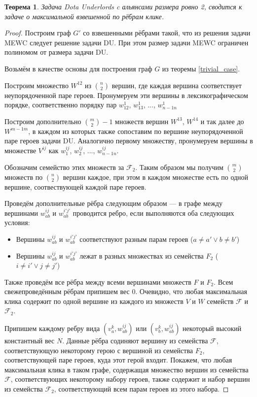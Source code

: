 \documentclass{article}
\newtheorem{theorem}{Теорема}
\begin{document}
\begin{theorem}
    Задача Dota Underlords c альянсами размера ровно 2, сводится к задаче о максимальной взвешенной по рёбрам клике.
\end{theorem}

\begin{proof}
    Построим граф $G'$ со взвешенными рёбрами такой, что из решения задачи MEWC следует решение задачи DU. При этом размер задачи MEWC ограничен полиномом от размера задачи DU.
    
    Возьмём в качестве основы для построения граф $G$ из теоремы \ref{trivial_case}.
    
    Построим множество $W^{12}$ из $\binom{n}{2}$ вершин, где каждая вершина соответствует неупорядоченной паре героев. Пронумеруем эти вершины в лексикографическом порядке, соответственно порядку пар $w_{12}^1$, $w_{13}^1$, ..., $w_{n-1 n}^1$
    
    Построим дополнительно $\binom{m}{2}-1$ множеств вершин $W^{13}$, $W^{14}$ и так далее до $W^{m-1 m}$, в каждом из которых также сопоставим по вершине неупорядоченной паре героев задачи DU. Аналогично первому множеству, пронумеруем вершины в множестве $V^{i j}$ как $w_1^{i j}$, $w_2^{i j}$, ..., $w_{n-1 n}^{i j}$.
    
    Обозначим семейство этих множеств за $\mathcal{F}_2$. Таким образом мы получим $\binom{m}{2}$ множеств по $\binom{n}{2}$ вершин каждое, при этом в каждом множестве есть по одной вершине, соотвествующей каждой паре героев.
    
    Проведём дополнительные рёбра следующим образом --- в графе между вершинами $w_{ab}^{i j}$ и $w_{ab}^{i' j'}$ проводится ребро, если выполняются оба следующих условия:
    \begin{itemize}
        \item Вершины $w_{ab}^{i j}$ и $w_{ab}^{i' j'}$ соответствуют разным парам героев ($a \neq a' \lor b \neq b'$)
        \item Вершины $w_{ab}^{i j}$ и $w_{ab}^{i' j'}$ лежат в разных множествах из семейства $F_2$ ($i \neq i' \lor j \neq j'$)
    \end{itemize}
    
    Также проведём все рёбра между всеми вершинами множеств $F$ и $F_2$. Всем свежепроведённым рёбрам припишем вес 0. Очевидно, что любая максимальная клика содержит по одной вершине из каждого из множеств $V$ и $W$ семейств $\mathcal{F}$ и $\mathcal{F}_2$. 
    
    Припишем каждому ребру вида $(v_a^k, w_{ab}^{i j})$ или $(v_b^k, w_{ab}^{i j})$ некоторый высокий константный вес $N$. Данные рёбра содиняют вершину из семейства $\mathcal{F}$, соответствующую некоторому герою с вершиной из семейства $F_2$, соответствующей паре героев, куда этот герой входит. Покажем, что любая максимальная клика в таком графе, содержащая множество вершин из семейства $\mathcal{F}$, соответствующих некоторому набору героев, также содержит и набор вершин из семейства $\mathcal{F}_2$, соответствующий всем парам героев из этого набора.
    

\end{proof}
\end{document}
